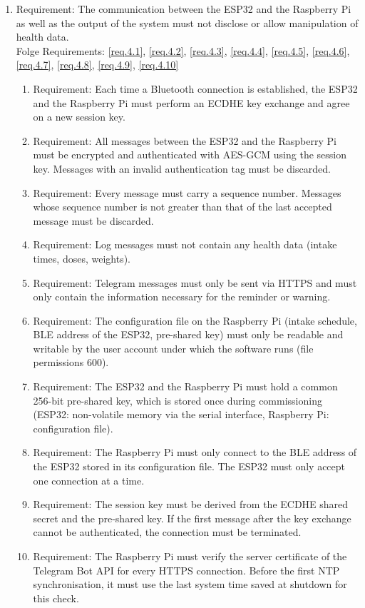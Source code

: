 	\begin{enumerate}[label*=\arabic*., start=4]
		\item \label{req.4} Requirement: The communication between the ESP32 and the Raspberry Pi as well as the output of the system must not disclose or allow manipulation of health data. \\
		Folge Requirements: \ref{req.4.1}, \ref{req.4.2}, \ref{req.4.3}, \ref{req.4.4}, \ref{req.4.5}, \ref{req.4.6}, \ref{req.4.7}, \ref{req.4.8}, \ref{req.4.9}, \ref{req.4.10}
		\begin{enumerate}[label*=\arabic*.]
			\item \label{req.4.1} Requirement: Each time a Bluetooth connection is established, the ESP32 and the Raspberry Pi must perform an ECDHE key exchange and agree on a new session key.
			\item \label{req.4.2} Requirement: All messages between the ESP32 and the Raspberry Pi must be encrypted and authenticated with AES-GCM using the session key. Messages with an invalid authentication tag must be discarded.
			\item \label{req.4.3} Requirement: Every message must carry a sequence number. Messages whose sequence number is not greater than that of the last accepted message must be discarded.
			\item \label{req.4.4} Requirement: Log messages must not contain any health data (intake times, doses, weights).
			\item \label{req.4.5} Requirement: Telegram messages must only be sent via HTTPS and must only contain the information necessary for the reminder or warning.
			\item \label{req.4.6} Requirement: The configuration file on the Raspberry Pi (intake schedule, BLE address of the ESP32, pre-shared key) must only be readable and writable by the user account under which the software runs (file permissions 600).
			\item \label{req.4.7} Requirement: The ESP32 and the Raspberry Pi must hold a common 256-bit pre-shared key, which is stored once during commissioning (ESP32: non-volatile memory via the serial interface, Raspberry Pi: configuration file).
			\item \label{req.4.8} Requirement: The Raspberry Pi must only connect to the BLE address of the ESP32 stored in its configuration file. The ESP32 must only accept one connection at a time.
			\item \label{req.4.9} Requirement: The session key must be derived from the ECDHE shared secret and the pre-shared key. If the first message after the key exchange cannot be authenticated, the connection must be terminated.
			\item \label{req.4.10} Requirement: The Raspberry Pi must verify the server certificate of the Telegram Bot API for every HTTPS connection. Before the first NTP synchronisation, it must use the last system time saved at shutdown for this check.
		\end{enumerate}
	\end{enumerate}

